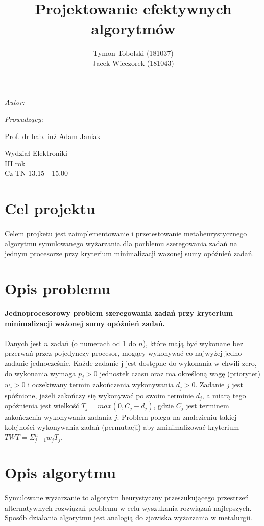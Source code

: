 \documentclass[wide,a4paper,titlepage,12pt] {article}
\title{Projektowanie efektywnych algorytmów}
\author{Tymon Tobolski (181037)\\ Jacek Wieczorek (181043)}
\makeatletter
\renewcommand{\maketitle}{
\begin{titlepage}
  \begin{center}
    \vspace*{3cm}
    \LARGE \@title \par
    \vspace{2cm}
    \textit{\small Autor:}\par
    \normalsize \@author\par \normalsize
    \vspace{3cm}
    \textit{\small Prowadzący:}\par
   Prof. dr hab. inż Adam Janiak \par
    \vspace{2cm}
    Wydział Elektroniki\\ III rok\\ Cz TN 13.15 - 15.00\par
    \vspace{4cm}
    \small \@date
  \end{center}
\end{titlepage}
}
\makeatother
\begin{document}
\maketitle
  \section{Cel projektu}
\paragraph{}
Celem projketu jest zaimplementowanie i przetestowanie metaheurystycznego algorytmu symulowanego wyżarzania dla porblemu szeregowania zadań na jednym procesorze przy kryterium minimalizacji wazonej sumy opóźnień zadań.
  \section{Opis problemu}
{\bf Jednoprocesorowy problem szeregowania zadań przy kryterium
minimalizacji ważonej sumy opóźnień zadań.}
\paragraph{}
Danych jest $n$ zadań (o numerach od 1 do $n$), które mają być wykonane bez przerwań przez pojedynczy procesor, mogący wykonywać co najwyżej jedno zadanie jednocześnie.
Każde zadanie j jest dostępne do wykonania w chwili zero, do wykonania wymaga $p_{j} > 0$ jednostek czasu oraz ma określoną wagę (priorytet) $w_{j} > 0$ i oczekiwany termin zakończenia
wykonywania $d_{j} > 0$. Zadanie $j$ jest spóźnione, jeżeli zakończy się wykonywać po swoim terminie $d_{j}$, a miarą tego opóźnienia jest wielkość $T_{j} = max(0, C_{j} - d_{j} )$, gdzie $C_{j}$ jest terminem zakończenia
wykonywania zadania $j$. Problem polega na znalezieniu takiej kolejności wykonywania zadań (permutacji) aby zminimalizować kryterium $TWT = \Sigma_{j=1}^{n} w_{j} T_{j}$.
\section{Opis algorytmu}
\paragraph{}
Symulowane wyżarzanie to algorytm heurystyczny przeszukującego przestrzeń alternatywnych rozwiązań problemu w celu wyszukania rozwiązań najlepszych. Sposób działania algorytmu jest analogią do zjawiska wyżarzania w metalurgii.
\end{document}
